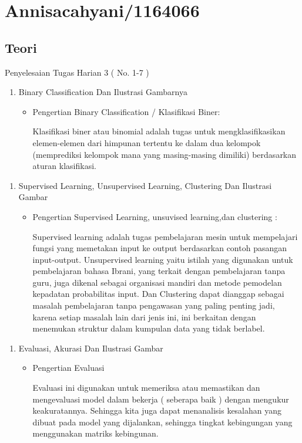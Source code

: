 \section{Annisacahyani/1164066}
\subsection{Teori}
Penyelesaian Tugas Harian 3 ( No. 1-7 )
\begin{enumerate}
\item Binary Classification Dan Ilustrasi Gambarnya
\begin{itemize}
\item Pengertian Binary Classification / Klasifikasi Biner:
\par Klasifikasi biner atau binomial adalah tugas untuk mengklasifikasikan elemen-elemen dari himpunan tertentu ke dalam dua kelompok (memprediksi kelompok mana yang masing-masing dimiliki) berdasarkan aturan klasifikasi.
\end{itemize}
\end{enumerate}

\begin{enumerate}
\item Supervised Learning, Unsupervised Learning, Clustering Dan Ilustrasi Gambar
\begin{itemize}
\item Pengertian Supervised Learning, unsuvised learning,dan clustering :
\par Supervised learning adalah tugas pembelajaran mesin untuk mempelajari fungsi yang memetakan input ke output berdasarkan contoh pasangan input-output. Unsupervised learning yaitu istilah yang digunakan untuk pembelajaran bahasa Ibrani, yang terkait dengan pembelajaran tanpa guru, juga dikenal sebagai organisasi mandiri dan metode pemodelan kepadatan probabilitas input. Dan Clustering dapat dianggap sebagai masalah pembelajaran tanpa pengawasan yang paling penting jadi, karena setiap masalah lain dari jenis ini, ini berkaitan dengan menemukan struktur dalam kumpulan data yang tidak berlabel.
\end{itemize}
\end{enumerate}

\begin{enumerate}
\item Evaluasi, Akurasi Dan Ilustrasi Gambar
\begin{itemize}
\item Pengertian Evaluasi
\par Evaluasi ini digunakan untuk memeriksa atau memastikan dan mengevaluasi model dalam bekerja ( seberapa baik ) dengan mengukur keakuratannya. Sehingga kita juga dapat menanalisis kesalahan yang dibuat pada model yang dijalankan, sehingga tingkat kebingungan yang menggunakan matriks kebingunan.
\end{itemize}
\end{enumerate}

